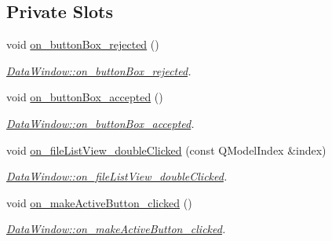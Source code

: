 \subsection*{Private Slots}
\begin{DoxyCompactItemize}
\item 
void \hyperlink{class_data_window_a04f666600237b8807b990a274688fcca}{on\+\_\+button\+Box\+\_\+rejected} ()
\begin{DoxyCompactList}\small\item\em \hyperlink{class_data_window_a04f666600237b8807b990a274688fcca}{Data\+Window\+::on\+\_\+button\+Box\+\_\+rejected}. \end{DoxyCompactList}\item 
void \hyperlink{class_data_window_ad87fafdcacd55f6edf71b61bcafc2a2d}{on\+\_\+button\+Box\+\_\+accepted} ()
\begin{DoxyCompactList}\small\item\em \hyperlink{class_data_window_ad87fafdcacd55f6edf71b61bcafc2a2d}{Data\+Window\+::on\+\_\+button\+Box\+\_\+accepted}. \end{DoxyCompactList}\item 
void \hyperlink{class_data_window_a23c96a1aa6f3c58cc8cc1eb9fe0535a7}{on\+\_\+file\+List\+View\+\_\+double\+Clicked} (const Q\+Model\+Index \&index)
\begin{DoxyCompactList}\small\item\em \hyperlink{class_data_window_a23c96a1aa6f3c58cc8cc1eb9fe0535a7}{Data\+Window\+::on\+\_\+file\+List\+View\+\_\+double\+Clicked}. \end{DoxyCompactList}\item 
void \hyperlink{class_data_window_a5ea68a603e92668ccb96b4d2375ce482}{on\+\_\+make\+Active\+Button\+\_\+clicked} ()
\begin{DoxyCompactList}\small\item\em \hyperlink{class_data_window_a5ea68a603e92668ccb96b4d2375ce482}{Data\+Window\+::on\+\_\+make\+Active\+Button\+\_\+clicked}. \end{DoxyCompactList}\end{DoxyCompactItemize}
